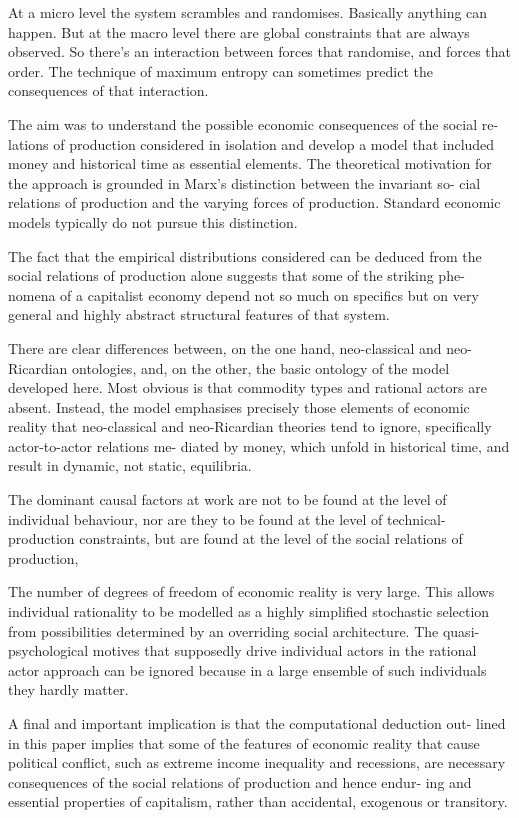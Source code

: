 \documentclass[
]{book}
\begin{document}
At a micro level the system scrambles and randomises.
Basically anything can happen.
But at the macro level there are global constraints that are always observed.
So there's an interaction between forces that randomise, and forces that order.
The technique of maximum entropy can sometimes predict the consequences of that interaction.

The aim was to understand the possible economic consequences of the social re-
lations of production considered in isolation and develop a model that included
money and historical time as essential elements. The theoretical motivation
for the approach is grounded in Marx's distinction between the invariant so-
cial relations of production and the varying forces of production. Standard
economic models typically do not pursue this distinction.

The fact that the empirical distributions considered can be deduced from the
social relations of production alone suggests that some of the striking phe-
nomena of a capitalist economy depend not so much on specifics but on very
general and highly abstract structural features of that system.

There are clear differences
between, on the one hand, neo-classical and neo-Ricardian ontologies, and,
on the other, the basic ontology of the model developed here. Most obvious
is that commodity types and rational actors are absent. Instead, the model
emphasises precisely those elements of economic reality that neo-classical and
neo-Ricardian theories tend to ignore, specifically actor-to-actor relations me-
diated by money, which unfold in historical time, and result in dynamic, not
static, equilibria.

The dominant causal
factors at work are not to be found at the level of individual behaviour, nor are
they to be found at the level of technical-production constraints, but are found
at the level of the social relations of production,

The
number of degrees of freedom of economic reality is very large. This allows
individual rationality to be modelled as a highly simplified stochastic selection
from possibilities determined by an overriding social architecture. The quasi-
psychological motives that supposedly drive individual actors in the rational
actor approach can be ignored because in a large ensemble of such individuals
they hardly matter.

A final and important implication is that the computational deduction out-
lined in this paper implies that some of the features of economic reality that
cause political conflict, such as extreme income inequality and recessions, are
necessary consequences of the social relations of production and hence endur-
ing and essential properties of capitalism, rather than accidental, exogenous
or transitory.
\end{document}
